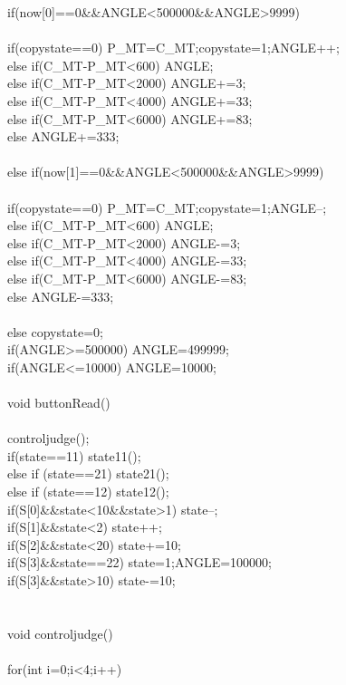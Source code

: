 \begin{verbbox}
{{	if(now[0]==0\&\&ANGLE<500000\&\&ANGLE>9999)\\
	{\\
		if(copystate==0) {P\_MT=C\_MT;copystate=1;ANGLE++;}\\
		else if(C\_MT-P\_MT<600) ANGLE;\\
		else if(C\_MT-P\_MT<2000) ANGLE+=3;\\
		else if(C\_MT-P\_MT<4000) ANGLE+=33;\\
		else if(C\_MT-P\_MT<6000) ANGLE+=83;\\
		else ANGLE+=333;\\
	}\\
	else if(now[1]==0\&\&ANGLE<500000\&\&ANGLE>9999)\\
	{\\
		if(copystate==0) {P\_MT=C\_MT;copystate=1;ANGLE--;}\\
		else if(C\_MT-P\_MT<600) ANGLE;\\
		else if(C\_MT-P\_MT<2000) ANGLE-=3;\\
		else if(C\_MT-P\_MT<4000) ANGLE-=33;\\
		else if(C\_MT-P\_MT<6000) ANGLE-=83;\\
		else ANGLE-=333;\\
	}\\
	else copystate=0;\\
	if(ANGLE>=500000) ANGLE=499999;\\
	if(ANGLE<=10000) ANGLE=10000;\\
}\\
void buttonRead()\\
{\\
	controljudge();\\
	if(state==11) state11(); \\
	else if (state==21) state21();\\
	else if (state==12) state12();\\
	if(S[0]\&\&state<10\&\&state>1) state--;\\
	if(S[1]\&\&state<2) state++;\\
	if(S[2]\&\&state<20) state+=10;\\
	if(S[3]\&\&state==22) {state=1;ANGLE=100000;}\\
	if(S[3]\&\&state>10) state-=10;\\
	\\
}\\
void controljudge()\\
{\\
	for(int i=0;i<4;i++)\\
	{\\
}}}
\end{verbbox}
